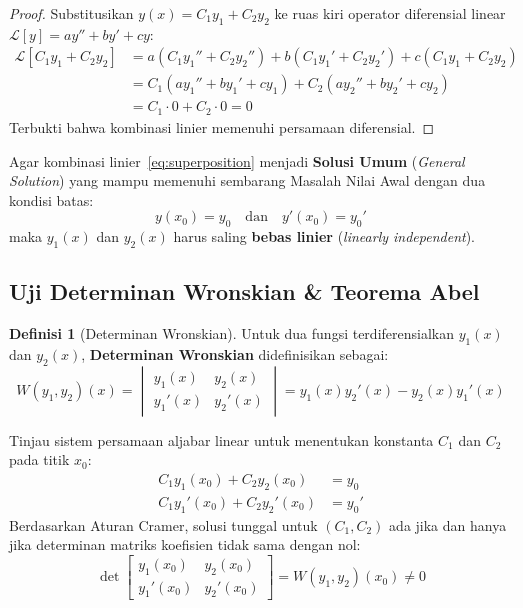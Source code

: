 \documentclass[11pt,a4paper]{article}
\theoremstyle{definition}
\newtheorem{definition}{Definisi}[section]
\begin{document}
\begin{proof}
Substitusikan $y(x) = C_1 y_1 + C_2 y_2$ ke ruas kiri operator diferensial linear $\mathcal{L}[y] = a y'' + b y' + c y$:
\begin{align*}
    \mathcal{L}[C_1 y_1 + C_2 y_2] &= a(C_1 y_1'' + C_2 y_2'') + b(C_1 y_1' + C_2 y_2') + c(C_1 y_1 + C_2 y_2) \\
    &= C_1 (a y_1'' + b y_1' + c y_1) + C_2 (a y_2'' + b y_2' + c y_2) \\
    &= C_1 \cdot 0 + C_2 \cdot 0 = 0
\end{align*}
Terbukti bahwa kombinasi linier memenuhi persamaan diferensial.
\end{proof}

Agar kombinasi linier~\eqref{eq:superposition} menjadi \textbf{Solusi Umum} (\textit{General Solution}) yang mampu memenuhi sembarang Masalah Nilai Awal dengan dua kondisi batas:
\begin{equation}
    y(x_0) = y_0 \quad \text{dan} \quad y'(x_0) = y_0'
    \label{eq:ivp2_conditions}
\end{equation}
maka $y_1(x)$ dan $y_2(x)$ harus saling \textbf{bebas linier} (\textit{linearly independent}).

\subsection{Uji Determinan Wronskian \& Teorema Abel}

\begin{definition}[Determinan Wronskian]
Untuk dua fungsi terdiferensialkan $y_1(x)$ dan $y_2(x)$, \textbf{Determinan Wronskian} didefinisikan sebagai:
\begin{equation}
    W(y_1, y_2)(x) = \begin{vmatrix} y_1(x) & y_2(x) \\ y_1'(x) & y_2'(x) \end{vmatrix} = y_1(x) y_2'(x) - y_2(x) y_1'(x)
    \label{eq:wronskian_def}
\end{equation}
\end{definition}

Tinjau sistem persamaan aljabar linear untuk menentukan konstanta $C_1$ dan $C_2$ pada titik $x_0$:
\begin{align}
    C_1 y_1(x_0) + C_2 y_2(x_0) &= y_0 \\
    C_1 y_1'(x_0) + C_2 y_2'(x_0) &= y_0'
\end{align}
Berdasarkan Aturan Cramer, solusi tunggal untuk $(C_1, C_2)$ ada jika dan hanya jika determinan matriks koefisien tidak sama dengan nol:
\begin{equation}
    \det \begin{bmatrix} y_1(x_0) & y_2(x_0) \\ y_1'(x_0) & y_2'(x_0) \end{bmatrix} = W(y_1, y_2)(x_0) \neq 0
\end{equation}
\end{document}
